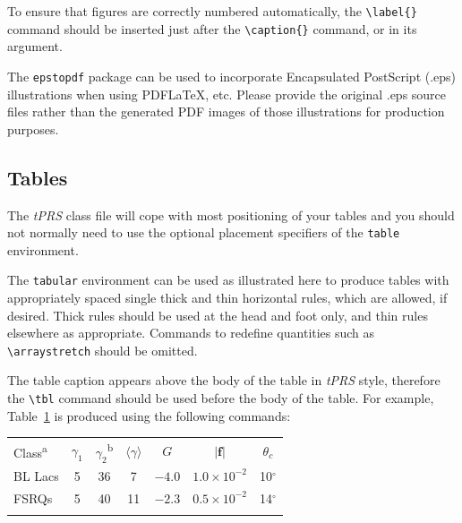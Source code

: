 \documentclass{tPRS2e}
\begin{document}
To ensure that figures are correctly numbered automatically, the \verb"\label{}" command should be inserted just
after the \verb"\caption{}" command, or in its argument.

The \texttt{epstopdf} package can be used to incorporate Encapsulated PostScript (.eps) illustrations when using PDF\LaTeX, etc.
Please provide the original .eps source files rather than the generated PDF images of those illustrations for production purposes.


\subsection{Tables}

The \textit{tPRS} class file will cope with most positioning of your tables and you should not normally need to use the optional
placement specifiers of the \texttt{table} environment.

The \texttt{tabular} environment can be used as illustrated here to produce tables with appropriately spaced single thick and thin
horizontal rules, which are allowed, if desired. Thick rules should be used at the head and foot only, and thin rules elsewhere as appropriate.
Commands to redefine quantities such as \verb"\arraystretch" should be omitted.

The table caption appears above the body of the table in \textit{tPRS} style, therefore the \verb"\tbl" command should be used before the body of the table.
For example, Table~\ref{sample-table} is produced using the following commands:

\begin{table}
{\begin{tabular}[l]{@{}lcccccc}\toprule
  Class\textsuperscript{a} & $\gamma _1$ & $\gamma _2$\textsuperscript{b}
         & $\langle \gamma \rangle$ & $G$ & $|{\bm f}|$ & $\theta _{c}$ \\
\colrule
  BL Lacs & 5 & 36 & 7 & $-4.0$ & $1.0\times 10^{-2}$ & 10$^\circ$ \\
  FSRQs & 5 & 40 & 11 & $-2.3$ & $0.5\times 10^{-2}$ & 14$^\circ$ \\
\botrule
\end{tabular}}
\label{sample-table}
\end{table}
\end{document}
